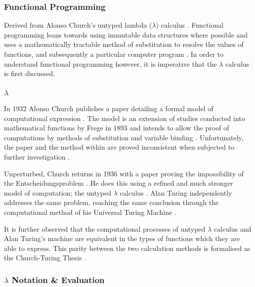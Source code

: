 \documentclass[12pt,a4paper]{article}
\begin{document}
\subsubsection{Functional Programming}

Derived from Alonso Church's untyped lambda ($\lambda$) calculus \cite{church1936}. Functional programming leans towards using immutable data structures where possible and uses a mathematically tractable method of substitution to resolve the values of functions, and subsequently a particular computer program  \cite{structureAndInterpretation,ImperativeFunctional}. In order to understand functional programming however, it is imperative that the $\lambda$ calculus is first discussed.

\subsubsection{$\lambda$}

In 1932 Alonso Church publishes a paper detailing a formal model of computational expression \cite{church1932}. The model is an extension of studies conducted into mathematical functions by Frege in 1893 and intends to allow the proof of computations by methods of substitution and variable binding \cite{lambdaHighlights}. Unfortunately, the paper and the method within are proved inconsistent when subjected to further investigation \cite{lambdaHighlights}.

Unperturbed, Church returns in 1936 with a paper proving the impossibility of the Entscheidungsproblem \cite{church1936,churchTuringThesis}. He does this using a refined and much stronger model of computation; the untyped $\lambda$ calculus \cite{church1936}. Alan Turing independently addresses the same problem, reaching the same conclusion through the computational method of his Universal Turing Machine \cite{turing1936,churchTuringThesis}.

It is further observed that the computational processes of untyped $\lambda$ calculus and Alan Turing's machine are equivalent in the types of functions which they are able to express. This parity between the two calculation methods is formalised as the Church-Turing Thesis \cite{churchTuringThesis,ImperativeFunctional}.

\subsubsection{$\lambda$ Notation \& Evaluation}
\end{document}
